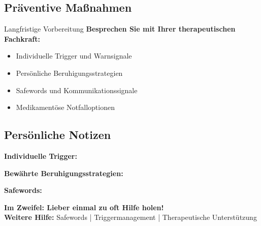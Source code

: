 \subsection{Präventive Maßnahmen}

\begin{ctmmPurpleBox}{Langfristige Vorbereitung}
\textbf{Besprechen Sie mit Ihrer therapeutischen Fachkraft:}
\begin{itemize}
    \item Individuelle Trigger und Warnsignale
    \item Persönliche Beruhigungsstrategien
    \item Safewords und Kommunikationssignale
    \item Medikamentöse Notfalloptionen
\end{itemize}
\end{ctmmPurpleBox}

\subsection{Persönliche Notizen}

\textbf{Individuelle Trigger:}

\textbf{Bewährte Beruhigungsstrategien:}

\textbf{Safewords:}

\vspace{1cm}
\begin{center}
\textcolor{ctmmRed}{\textbf{\faExclamationTriangle{} Im Zweifel: Lieber einmal zu oft Hilfe holen!}} \\
\faCompass{} \textcolor{ctmmBlue}{\textbf{Weitere Hilfe:}} 
\textcolor{ctmmGray}{Safewords | Triggermanagement | Therapeutische Unterstützung}
\end{center}